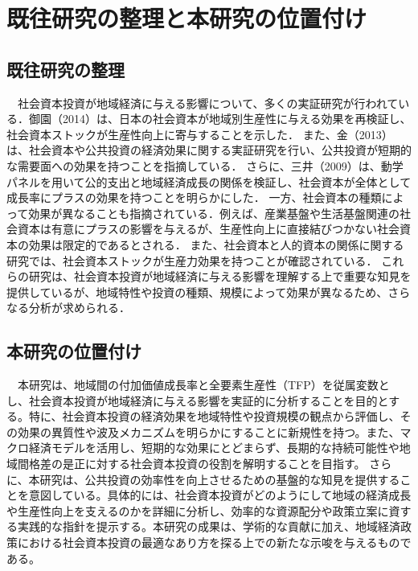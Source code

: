 \chapter{既往研究の整理と本研究の位置付け}

\section{既往研究の整理}
　社会資本投資が地域経済に与える影響について、多くの実証研究が行われている．御園（2014）\cite{misono2014}は、日本の社会資本が地域別生産性に与える効果を再検証し、社会資本ストックが生産性向上に寄与することを示した． また、金（2013）\cite{kim2013}は、社会資本や公共投資の経済効果に関する実証研究を行い、公共投資が短期的な需要面への効果を持つことを指摘している． さらに、三井（2009）\cite{mitsui2009}は、動学パネルを用いて公的支出と地域経済成長の関係を検証し、社会資本が全体として成長率にプラスの効果を持つことを明らかにした． 一方、社会資本の種類によって効果が異なることも指摘されている．例えば、産業基盤や生活基盤関連の社会資本は有意にプラスの影響を与えるが、生産性向上に直接結びつかない社会資本の効果は限定的であるとされる\cite{mitsui2010}． また、社会資本と人的資本の関係に関する研究では、社会資本ストックが生産力効果を持つことが確認されている\cite{yamano2007}． これらの研究は、社会資本投資が地域経済に与える影響を理解する上で重要な知見を提供しているが、地域特性や投資の種類、規模によって効果が異なるため、さらなる分析が求められる．
 
\section{本研究の位置付け}
　本研究は、地域間の付加価値成長率と全要素生産性（TFP）を従属変数とし、社会資本投資が地域経済に与える影響を実証的に分析することを目的とする。特に、社会資本投資の経済効果を地域特性や投資規模の観点から評価し、その効果の異質性や波及メカニズムを明らかにすることに新規性を持つ。また、マクロ経済モデルを活用し、短期的な効果にとどまらず、長期的な持続可能性や地域間格差の是正に対する社会資本投資の役割を解明することを目指す。
さらに、本研究は、公共投資の効率性を向上させるための基盤的な知見を提供することを意図している。具体的には、社会資本投資がどのようにして地域の経済成長や生産性向上を支えるのかを詳細に分析し、効率的な資源配分や政策立案に資する実践的な指針を提示する。本研究の成果は、学術的な貢献に加え、地域経済政策における社会資本投資の最適なあり方を探る上での新たな示唆を与えるものである。
